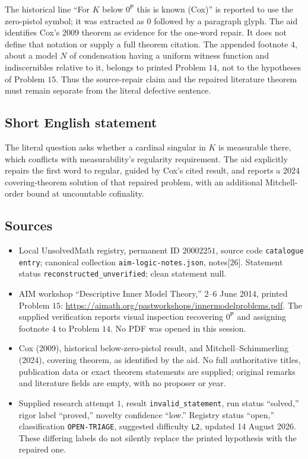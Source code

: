 \documentclass[11pt]{article}
\begin{document}
The historical line ``For \(K\) below \(0^{\mathsf P}\) this is known (Cox)'' is reported to use the zero-pistol symbol; it was extracted as \(0\) followed by a paragraph glyph. The aid identifies Cox's 2009 theorem as evidence for the one-word repair. It does not define that notation or supply a full theorem citation. The appended footnote \(4\), about a model \(N\) of condensation having a uniform witness function and indiscernibles relative to it, belongs to printed Problem \(14\), not to the hypotheses of Problem \(15\). Thus the source-repair claim and the repaired literature theorem must remain separate from the literal defective sentence.
\subsection{Short English statement}
The literal question asks whether a cardinal singular in \(K\) is measurable there, which conflicts with measurability's regularity requirement. The aid explicitly repairs the first word to regular, guided by Cox's cited result, and reports a 2024 covering-theorem solution of that repaired problem, with an additional Mitchell-order bound at uncountable cofinality.
\subsection{Sources}
\begin{itemize}
\item Local UnsolvedMath registry, permanent ID \(20002251\), source code \texttt{catalogue entry}; canonical collection \texttt{aim-logic-notes.json}, notes[26]. Statement status \texttt{reconstructed\_unverified}; clean statement null.
\item AIM workshop ``Descriptive Inner Model Theory,'' 2--6 June 2014, printed Problem \(15\): \url{https://aimath.org/pastworkshops/innermodelproblems.pdf}. The supplied verification reports visual inspection recovering \(0^{\mathsf P}\) and assigning footnote \(4\) to Problem \(14\). No PDF was opened in this session.
\item Cox (2009), historical below-zero-pistol result, and Mitchell--Schimmerling (2024), covering theorem, as identified by the aid. No full authoritative titles, publication data or exact theorem statements are supplied; original remarks and literature fields are empty, with no proposer or year.
\item Supplied research attempt \(1\), result \texttt{invalid\_statement}, run status ``solved,'' rigor label ``proved,'' novelty confidence ``low.'' Registry status ``open,'' classification \texttt{OPEN-TRIAGE}, suggested difficulty \texttt{L2}, updated 14 August 2026. These differing labels do not silently replace the printed hypothesis with the repaired one.
\end{itemize}
\end{document}
